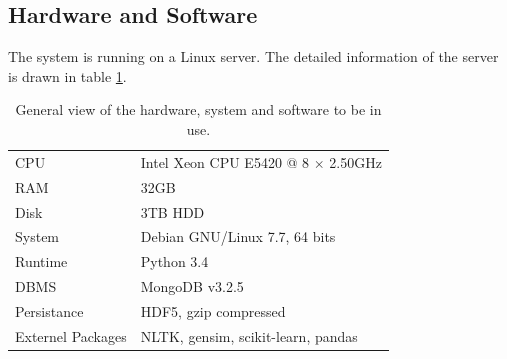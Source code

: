 \bigbreak

\clearpage

\subsection{Hardware and Software}

The system is running on a Linux server. The detailed information of the server is drawn in table \ref{tab:pcinfo}.

\begin{table}[!htb]
\begin{tabular}{ll}
CPU & Intel Xeon CPU E5420 @ 8 $\times$ 2.50GHz \\
RAM & 32GB \\ 
Disk & 3TB HDD \\ 
System & Debian GNU/Linux 7.7, 64 bits \\ 
Runtime & Python 3.4 \\
DBMS & MongoDB v3.2.5\\ 
Persistance & HDF5, gzip compressed \\
Externel Packages & NLTK, gensim, scikit-learn, pandas \\
\end{tabular}
\caption{General view of the hardware, system and software to be in use. }
\label{tab:pcinfo}
\end{table}
